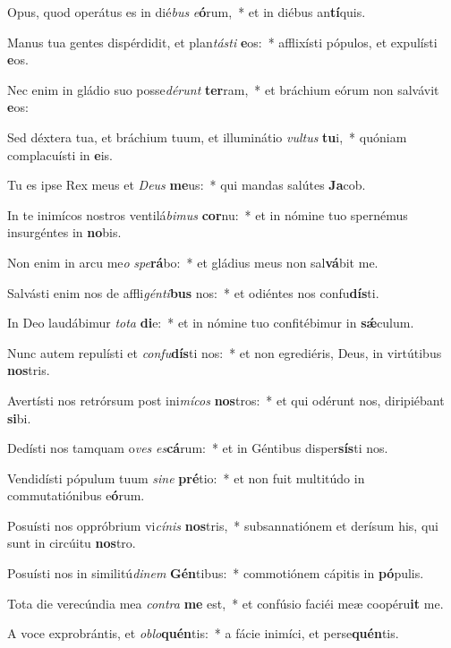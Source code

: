 \item Opus, quod operátus es in dié\textit{bus} \textit{e}\textbf{ó}rum,~* et in diébus an\textbf{tí}quis.
\item Manus tua gentes dispérdidit, et plan\textit{tás}\textit{ti} \textbf{e}os:~* afflixísti pópulos, et expulísti \textbf{e}os.
\item Nec enim in gládio suo posse\textit{dé}\textit{runt} \textbf{ter}ram,~* et bráchium eórum non salvávit \textbf{e}os:
\item Sed déxtera tua, et bráchium tuum, et illuminátio \textit{vul}\textit{tus} \textbf{tu}i,~* quóniam complacuísti in \textbf{e}is.
\item Tu es ipse Rex meus et \textit{De}\textit{us} \textbf{me}us:~* qui mandas salútes \textbf{Ja}cob.
\item In te inimícos nostros ventilá\textit{bi}\textit{mus} \textbf{cor}nu:~* et in nómine tuo spernémus insurgéntes in \textbf{no}bis.
\item Non enim in arcu me\textit{o} \textit{spe}\textbf{rá}bo:~* et gládius meus non sal\textbf{vá}bit me.
\item Salvásti enim nos de affli\textit{gén}\textit{ti}\textbf{bus} nos:~* et odiéntes nos confu\textbf{dís}ti.
\item In Deo laudábimur \textit{to}\textit{ta} \textbf{di}e:~* et in nómine tuo confitébimur in \textbf{sǽ}culum.
\item Nunc autem repulísti et \textit{con}\textit{fu}\textbf{dís}ti nos:~* et non egrediéris, Deus, in virtútibus \textbf{nos}tris.
\item Avertísti nos retrórsum post ini\textit{mí}\textit{cos} \textbf{nos}tros:~* et qui odérunt nos, diripiébant \textbf{si}bi.
\item Dedísti nos tamquam o\textit{ves} \textit{es}\textbf{cá}rum:~* et in Géntibus disper\textbf{sís}ti nos.
\item Vendidísti pópulum tuum \textit{si}\textit{ne} \textbf{pré}tio:~* et non fuit multitúdo in commutatiónibus e\textbf{ó}rum.
\item Posuísti nos oppróbrium vi\textit{cí}\textit{nis} \textbf{nos}tris,~* subsannatiónem et derísum his, qui sunt in circúitu \textbf{nos}tro.
\item Posuísti nos in similitú\textit{di}\textit{nem} \textbf{Gén}tibus:~* commotiónem cápitis in \textbf{pó}pulis.
\item Tota die verecúndia mea \textit{con}\textit{tra} \textbf{me} est,~* et confúsio faciéi meæ coopéru\textbf{it} me.
\item A voce exprobrántis, et \textit{ob}\textit{lo}\textbf{quén}tis:~* a fácie inimíci, et perse\textbf{quén}tis.
